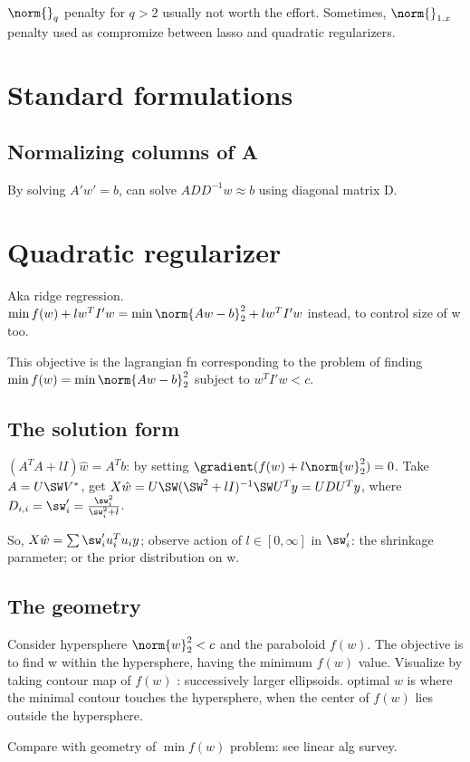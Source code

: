 \documentclass[oneside, article]{memoir}
\begin{document}
$\norm{}_{q}$ penalty for $q> 2$ usually not worth the effort. Sometimes, $\norm{}_{1.x}$ penalty used as compromize between lasso and quadratic regularizers.

\section{Standard formulations}
\subsection{Normalizing columns of A}
By solving $A'w' = b$, can solve $ADD^{-1}w \approx b$ using diagonal matrix D.

\section{Quadratic regularizer}
Aka ridge regression. \\
$\min f(w) + lw^{T}I'w= \min \norm{Aw-b}_{2}^{2}+ lw^{T}I'w$ instead, to control size of w too.

This objective is the lagrangian fn corresponding to the problem of finding $\min f(w) = \min \norm{Aw-b}_{2}^{2}$ subject to $w^{T}I'w < c$.

\subsection{The solution form}
$(A^{T}A + lI)\hat{w} = A^{T}b$: by setting $\gradient (f(w) + l\norm{w}_{2}^{2})= 0$. Take $A = U\SW V^{*}$, get $X\hat{w} = U \SW (\SW^{2} + lI)^{-1} \SW U^{T}y = UDU^{T}y$, where $D_{i,i} = \sw_{i}' = \frac{\sw_{i}^{2}}{\sw_{i}^{2} + l}$.

So, $X\hat{w} = \sum \sw_{i}' u_{i}^{T} u_{i}y$; observe action of $l \in [0,\infty]$ in $\sw_{i}'$: the shrinkage parameter; or the prior distribution on w.

\subsection{The geometry}
Consider hypersphere $\norm{w}_{2}^{2} < c$ and the paraboloid $f(w)$. The objective is to find w within the hypersphere, having the minimum $f(w)$ value. Visualize by taking contour map of $f(w)$ : successively larger ellipsoids. optimal $w$ is where the minimal contour touches the hypersphere, when the center of $f(w)$ lies outside the hypersphere.

Compare with geometry of $\min f(w)$ problem: see linear alg survey.
\end{document}
